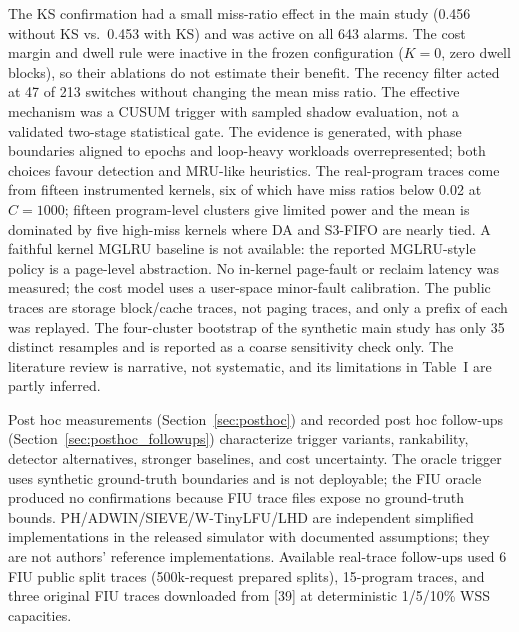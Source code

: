 \documentclass[10pt,twocolumn,a4paper]{IEEEtran}
\begin{document}
The KS confirmation had a small miss-ratio effect in the main study (0.456
without KS vs.\ 0.453 with KS) and was active on all 643 alarms. The cost
margin and dwell rule were inactive in the frozen configuration ($K = 0$, zero
dwell blocks), so their ablations do not estimate their benefit. The recency
filter acted at 47 of 213 switches without changing the mean miss ratio. The
effective mechanism was a CUSUM trigger with sampled shadow evaluation, not a
validated two-stage statistical gate. The evidence
is generated, with phase boundaries aligned to epochs and loop-heavy workloads
overrepresented; both choices favour detection and MRU-like heuristics. The
real-program traces come from fifteen instrumented kernels, six of which have
miss ratios below 0.02 at $C = 1000$; fifteen program-level clusters give
limited power and the mean is dominated by five high-miss kernels where DA and
S3-FIFO are nearly tied. A faithful kernel MGLRU baseline is not available:
the reported MGLRU-style policy is a page-level abstraction. No in-kernel
page-fault or reclaim latency was measured; the cost model uses a user-space
minor-fault calibration. The public traces are storage block/cache traces, not
paging traces, and only a prefix of each was replayed. The four-cluster
bootstrap of the synthetic main study has only 35 distinct resamples and is
reported as a coarse sensitivity check only. The literature review is
narrative, not systematic, and its limitations in Table~I are partly inferred.

Post hoc measurements (Section~\ref{sec:posthoc}) and recorded post hoc follow-ups
(Section~\ref{sec:posthoc_followups}) characterize trigger variants, rankability,
detector alternatives, stronger baselines, and cost uncertainty. The oracle
trigger uses synthetic ground-truth boundaries and is not deployable; the FIU
oracle produced no confirmations because FIU trace files expose no
ground-truth bounds. PH/ADWIN/SIEVE/W-TinyLFU/LHD are independent simplified
implementations in the released simulator with documented assumptions; they
are not authors' reference implementations. Available real-trace follow-ups
used 6 FIU public split traces (500k-request prepared splits), 15-program
traces, and three original FIU traces downloaded from [39] at deterministic
1/5/10\% WSS capacities.
\end{document}
